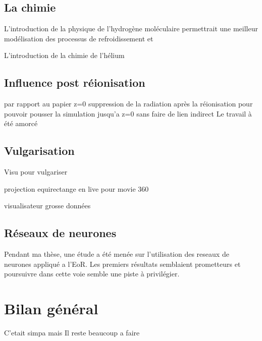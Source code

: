\section{La chimie}

L'introduction de la physique de l'hydrogène moléculaire permettrait une meilleur modélisation des processus de refroidissement et 

L'introduction de la chimie de l'hélium

\section{Influence post réionisation}
par  rapport au papier z=0
suppression de la radiation après la réionisation pour pouvoir pousser la simulation jusqu'a z=0 sans faire de lien indirect
Le travail à été amorcé


\section{Vulgarisation}
Visu pour vulgariser

projection equirectange en live pour movie 360

visualisateur grosse données

\section{Réseaux de neurones}
Pendant ma thèse, une étude a été menée sur l'utilisation des reseaux de neurones appliqué a l'EoR.
Les premiers résultats semblaient prometteurs et poursuivre dans cette voie semble une piste à privilégier.




\chapter{Bilan général}

C'etait simpa mais 
Il reste beaucoup a faire